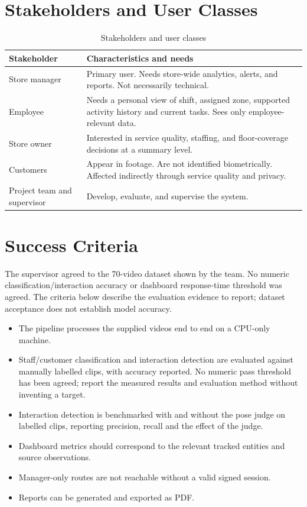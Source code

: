 \section{Stakeholders and User Classes}
\begin{table}[H]
\centering
\caption{Stakeholders and user classes}
\begin{tabular}{P{0.2\textwidth}P{0.7\textwidth}}
\toprule
Stakeholder & Characteristics and needs\\
\midrule
Store manager & Primary user. Needs store-wide analytics, alerts, and reports. Not necessarily technical.\\
Employee & Needs a personal view of shift, assigned zone, supported activity history and current tasks. Sees only employee-relevant data.\\
Store owner & Interested in service quality, staffing, and floor-coverage decisions at a summary level.\\
Customers & Appear in footage. Are not identified biometrically. Affected indirectly through service quality and privacy.\\
Project team and supervisor & Develop, evaluate, and supervise the system.\\
\bottomrule
\end{tabular}
\end{table}

\section{Success Criteria}
The supervisor agreed to the 70-video dataset shown by the team. No numeric classification/interaction accuracy or dashboard response-time threshold was agreed. The criteria below describe the evaluation evidence to report; dataset acceptance does not establish model accuracy.
\begin{itemize}
\item The pipeline processes the supplied videos end to end on a CPU-only machine.
\item Staff/customer classification and interaction detection are evaluated against manually labelled clips, with accuracy reported. No numeric pass threshold has been agreed; report the measured results and evaluation method without inventing a target.
\item Interaction detection is benchmarked with and without the pose judge on labelled clips, reporting precision, recall and the effect of the judge.
\item Dashboard metrics should correspond to the relevant tracked entities and source observations.
\item Manager-only routes are not reachable without a valid signed session.
\item Reports can be generated and exported as PDF.
\end{itemize}

